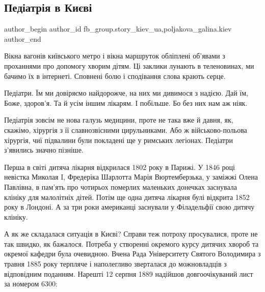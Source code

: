  
 
 
 
 
 
\subsection{Педіатрія в Києві}
\label{sec:25_12_2021.fb.fb_group.story_kiev_ua.2.pediatria}
 
\ifcmt
 author_begin
   author_id fb_group.story_kiev_ua,poljakova_galina.kiev
 author_end
\fi

Вікна вагонів київського метро і вікна маршруток обліплені об’явами з
проханнями про допомогу хворим дітям. Ці заклики лунають в теленовинах, ми
бачимо їх в інтернеті. Сповнені болю і сподівання слова крають серце. 


Педіатри. Їм ми довіряємо найдорожче, на них ми дивимося з надією. Дай їм,
Боже, здоров’я. Та й усім іншим лікарям. І побільше. Бо без них нам аж ніяк. 

Педіатрія зовсім не нова галузь медицини, проте не така вже й давня, як,
скажімо, хірургія з її славнозвісними цирульниками. Або ж військово-польова
хірургія, чиї підвалини були покладені ще у римських легіонах. Педіатри
з’явились значно пізніше. 

Перша в світі дитяча лікарня відкрилася 1802 року в Парижі. У 1846 році
невістка Миколая I, Фредеріка Шарлотта Марія Вюртемберзька, у заміжжі Олена
Павлівна, в пам’ять про чотирьох померлих маленьких донечках заснувала клініку
для  малолітніх дітей. Потім ще одна дитяча лікарня булі відкрита 1852 року в
Лондоні. А за три роки американці заснували у Філадельфії свою дитячу клініку.

А як же складалася ситуація в Києві? Справи теж потроху просувалися, проте не
так швидко, як бажалося. Потреба у створенні окремого курсу дитячих хвороб та
окремої кафедри була очевидною. Вчена Рада Університету Святого Володимира з
травня 1885 року терпляче і наполегливо зверталася до можновладців з
відповідним поданням. Нарешті 12 серпня 1889 надійшов довгоочікуваний лист за
номером 6300: 

